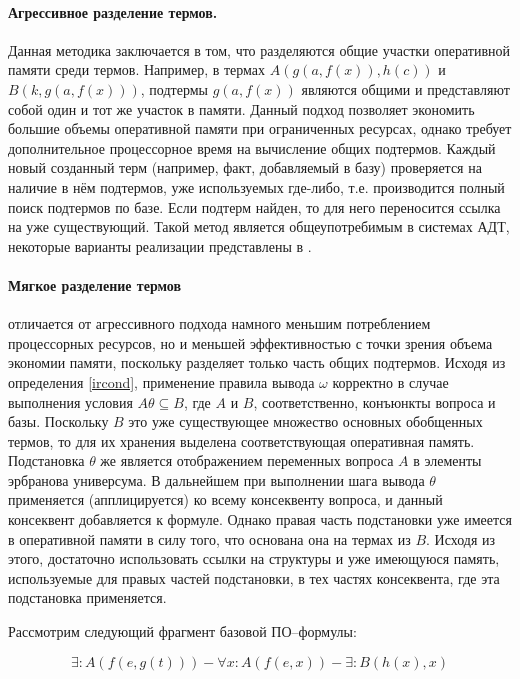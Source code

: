 \paragraph{Агрессивное разделение термов.} Данная методика заключается в том, что разделяются общие участки оперативной памяти среди термов. Например, в термах $A(g(a,f(x)),h(c))$ и $B(k,g(a,f(x)))$, подтермы $g(a,f(x))$ являются общими и представляют собой один и тот же участок в памяти. Данный подход позволяет экономить большие объемы оперативной памяти при ограниченных ресурсах, однако требует дополнительное процессорное время на вычисление общих подтермов. Каждый новый созданный терм (например, факт, добавляемый в базу) проверяется на наличие в нём подтермов, уже используемых где-либо, т.е. производится полный поиск подтермов по базе. Если подтерм найден, то для него переносится ссылка на уже существующий. Такой метод является общеупотребимым в системах АДТ, некоторые варианты реализации представлены в \cite{Ryazanov2003}.

\paragraph{Мягкое разделение термов} отличается от агрессивного подхода намного меньшим потреблением процессорных ресурсов, но и меньшей эффективностью с точки зрения объема экономии памяти, поскольку разделяет только часть общих подтермов. Исходя из определения \ref{ircond}, применение правила вывода $\omega$ корректно в случае выполнения условия $A\theta \subseteq B$, где $A$ и $B$, соответственно, конъюнкты вопроса и базы. Поскольку $B$ это уже существующее множество основных обобщенных термов, то для их хранения выделена соответствующая оперативная память. Подстановка $\theta$ же является отображением переменных вопроса $A$ в элементы эрбранова универсума. В дальнейшем при выполнении шага вывода $\theta$ применяется (апплицируется) ко всему консеквенту вопроса, и данный консеквент добавляется к формуле. Однако правая часть подстановки уже имеется в оперативной памяти в силу того, что основана она на термах из $B$. Исходя из этого, достаточно использовать ссылки на структуры и уже имеющуюся память, используемые для правых частей подстановки, в тех частях консеквента, где эта подстановка применяется.

Рассмотрим следующий фрагмент базовой ПО--формулы:

$$ \exists:A(f(e,g(t))) - \forall x:A(f(e,x)) - \exists:B(h(x),x) $$

